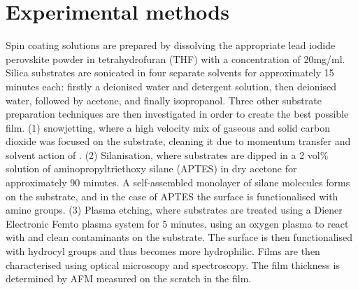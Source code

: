 \section{Experimental methods}
\label{sec:glass}
Spin coating solutions are prepared by dissolving the appropriate lead iodide perovskite powder in tetrahydrofuran (THF) with a concentration of 20mg/ml. Silica substrates are sonicated in four separate solvents for approximately 15 minutes each: firstly a deionised water and detergent solution, then deionised water, followed by acetone, and finally isopropanol. Three other substrate preparation techniques are then investigated in order to create the best possible film. (1)  snowjetting, where a high velocity mix of gaseous and solid carbon dioxide was focused on the substrate, cleaning it due to momentum transfer and solvent action of  \cite{snowjet1}. (2) Silanisation, where substrates are dipped in a 2 vol\% solution of aminopropyltriethoxy silane (APTES) in dry acetone for approximately 90 minutes. A self-assembled monolayer of silane molecules forms on the substrate, and in the case of APTES the surface is functionalised with amine groups. (3) Plasma etching, where substrates are treated using a Diener Electronic Femto plasma system for 5 minutes, using an oxygen plasma to react with and clean contaminants on the substrate. The surface is then functionalised with hydrocyl groups and thus becomes more hydrophilic. Films are then characterised using optical microscopy and spectroscopy. The film thickness is determined by AFM measured on the scratch in the film.

